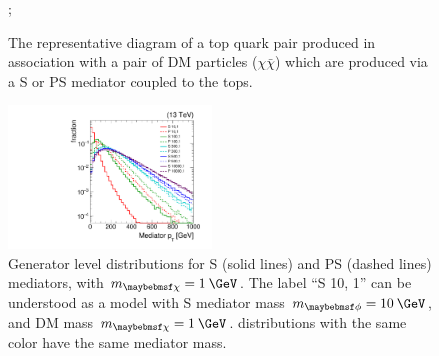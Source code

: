 \begin{figure}
  \begin{center}
    ;
    \caption{The representative diagram of a top quark pair produced in association with a pair of DM particles ($\chi\bar{\chi}$) which are produced via a S or PS mediator coupled to the tops.}
    \label{fig:ttDM}
  \end{center}
\end{figure}

\begin{figure}[htbp!]
  \begin{center}
    \includegraphics[width=0.48\textwidth]{figs/medptlog.pdf}
    \caption{Generator level \pt distributions for S (solid lines) and PS (dashed lines) mediators, with $\mDM=1\:\GeV$. The label ``S 10, 1'' can be understood as a model with S mediator mass $\mMed=10\:\GeV$, and DM mass $\mDM=1\:\GeV$. \pt distributions with the same color have the same mediator mass.}
    \label{fig:SvPSmedpt}
  \end{center}
\end{figure}


